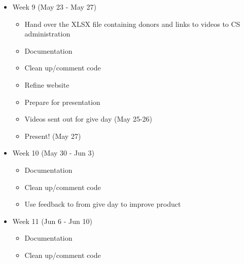 \documentclass{article}
\begin{document}
\begin{itemize}
\begin{itemize}
    \end{itemize}
    \item Week 9 (May 23 - May 27)
    \begin{itemize}
        \item Hand over the XLSX file containing donors and links to videos to CS administration
        \item Documentation
        \item Clean up/comment code
        \item Refine website
        \item Prepare for presentation
        \item Videos sent out for give day (May 25-26)
        \item Present! (May 27)
    \end{itemize}
    \item Week 10 (May 30 - Jun 3)
    \begin{itemize}
        \item Documentation
        \item Clean up/comment code
        \item Use feedback to from give day to improve product
    \end{itemize}
    \item Week 11 (Jun 6 - Jun 10)
    \begin{itemize}
        \item Documentation
        \item Clean up/comment code
    \end{itemize}
\end{itemize}
\end{document}
